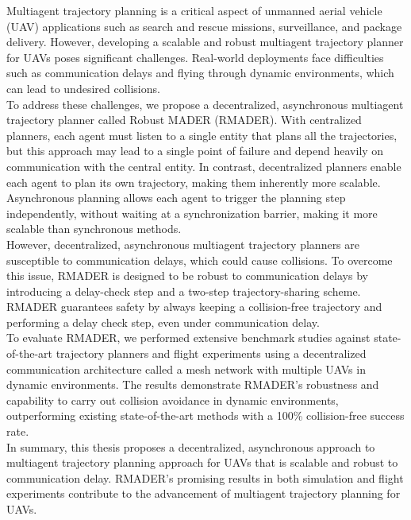 % 
% 
%
Multiagent trajectory planning is a critical aspect of unmanned aerial vehicle (UAV) applications such as search and rescue missions, surveillance, and package delivery. However, developing a scalable and robust multiagent trajectory planner for UAVs poses significant challenges. Real-world deployments face difficulties such as communication delays and flying through dynamic environments, which can lead to undesired collisions.
\\

To address these challenges, we propose a decentralized, asynchronous multiagent trajectory planner called Robust MADER (RMADER). With centralized planners, each agent must listen to a single entity that plans all the trajectories, but this approach may lead to a single point of failure and depend heavily on communication with the central entity. In contrast, decentralized planners enable each agent to plan its own trajectory, making them inherently more scalable. Asynchronous planning allows each agent to trigger the planning step independently, without waiting at a synchronization barrier, making it more scalable than synchronous methods.
\\

However, decentralized, asynchronous multiagent trajectory planners are susceptible to communication delays, which could cause collisions. To overcome this issue, RMADER is designed to be robust to communication delays by introducing a delay-check step and a two-step trajectory-sharing scheme. RMADER guarantees safety by always keeping a collision-free trajectory and performing a delay check step, even under communication delay. 
\\

To evaluate RMADER, we performed extensive benchmark studies against state-of-the-art trajectory planners and flight experiments using a decentralized communication architecture called a mesh network with multiple UAVs in dynamic environments. The results demonstrate RMADER's robustness and capability to carry out collision avoidance in dynamic environments, outperforming existing state-of-the-art methods with a 100\% collision-free success rate.
\\

In summary, this thesis proposes a decentralized, asynchronous approach to multiagent trajectory planning approach for UAVs that is scalable and robust to communication delay. RMADER's promising results in both simulation and flight experiments contribute to the advancement of multiagent trajectory planning for UAVs.
